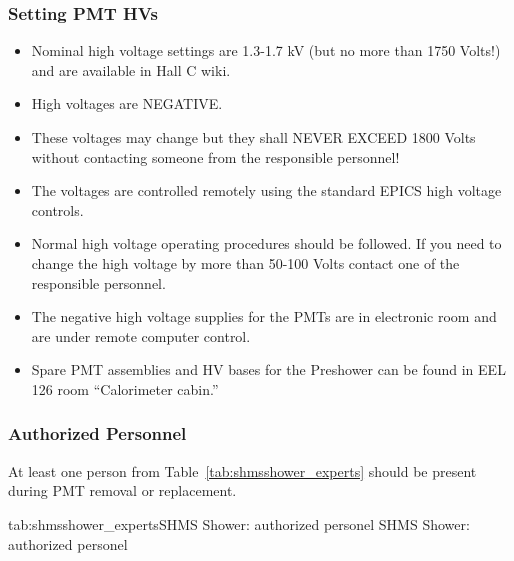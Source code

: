 {\subsubsection*{Setting PMT HVs}
\begin{itemize}
\item Nominal high voltage settings are 1.3-1.7 kV (but no more than
  1750 Volts!)  and are available in Hall C wiki.
\item High voltages are NEGATIVE.
\item These voltages may change but they shall NEVER EXCEED 1800 Volts
  without contacting someone from the responsible personnel!
\item The voltages are controlled remotely using the standard EPICS high voltage controls.
\item Normal high voltage operating procedures should be followed. If
  you need to change the high voltage by more than 50-100 Volts
  contact one of the responsible personnel.
\item The negative high voltage supplies for the PMTs are in
  electronic room and are under remote computer control.
\item Spare PMT assemblies and HV bases for the Preshower can be
  found in EEL 126 room ``Calorimeter cabin.''
\end{itemize}


\subsubsection{Authorized Personnel}
At least one person from Table~\ref{tab:shmsshower_experts} should be
present during PMT removal or replacement.

\begin{namestab}{tab:shmsshower_experts}{SHMS Shower: authorized personel}{
    SHMS Shower: authorized personel}
  \VardanTadevosyan{}
  \HamletMkrtchyan{}
  \ArthurMkrtchyan{}
\end{namestab}


} %
